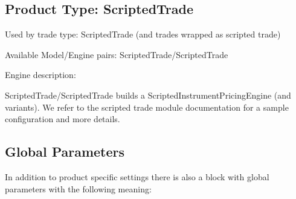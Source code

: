 \subsection{Product Type: ScriptedTrade}

Used by trade type: ScriptedTrade (and trades wrapped as scripted trade)

Available Model/Engine pairs: ScriptedTrade/ScriptedTrade

Engine description:

ScriptedTrade/ScriptedTrade builds a ScriptedInstrumentPricingEngine (and variants). We refer to the scripted trade
module documentation for a sample configuration and more details.

\subsection{Global Parameters}

In addition to product specific settings there is also a block with global parameters with the following meaning:

